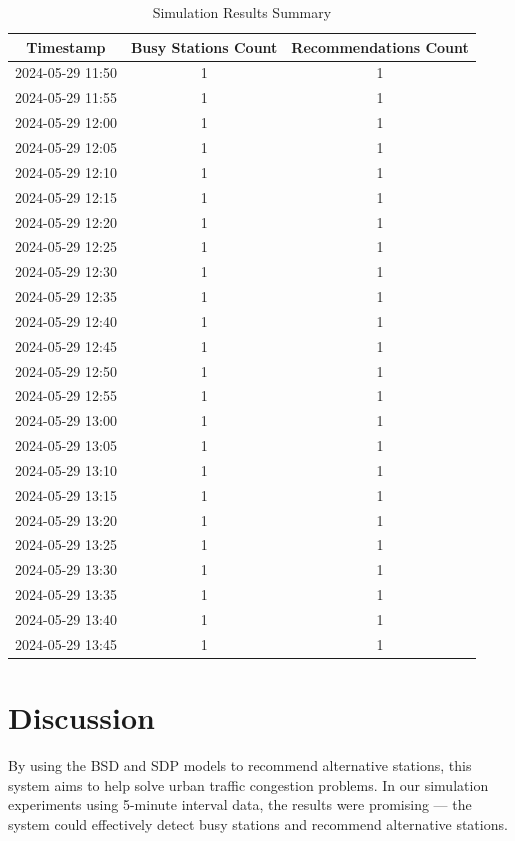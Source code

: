 \documentclass[11pt]{article} %
\begin{document}
\begin{table}[h]
	\centering
	\caption{Simulation Results Summary}
	\label{tab:simulation_results}
	\begin{tabular}{|c|c|c|}
		\hline
		\textbf{Timestamp} & \textbf{Busy Stations Count} & \textbf{Recommendations Count} \\ \hline
		2024-05-29 11:50 & 1 & 1 \\ \hline
		2024-05-29 11:55 & 1 & 1 \\ \hline
		2024-05-29 12:00 & 1 & 1 \\ \hline
		2024-05-29 12:05 & 1 & 1 \\ \hline
		2024-05-29 12:10 & 1 & 1 \\ \hline
		2024-05-29 12:15 & 1 & 1 \\ \hline
		2024-05-29 12:20 & 1 & 1 \\ \hline
		2024-05-29 12:25 & 1 & 1 \\ \hline
		2024-05-29 12:30 & 1 & 1 \\ \hline
		2024-05-29 12:35 & 1 & 1 \\ \hline
		2024-05-29 12:40 & 1 & 1 \\ \hline
		2024-05-29 12:45 & 1 & 1 \\ \hline
		2024-05-29 12:50 & 1 & 1 \\ \hline
		2024-05-29 12:55 & 1 & 1 \\ \hline
		2024-05-29 13:00 & 1 & 1 \\ \hline
		2024-05-29 13:05 & 1 & 1 \\ \hline
		2024-05-29 13:10 & 1 & 1 \\ \hline
		2024-05-29 13:15 & 1 & 1 \\ \hline
		2024-05-29 13:20 & 1 & 1 \\ \hline
		2024-05-29 13:25 & 1 & 1 \\ \hline
		2024-05-29 13:30 & 1 & 1 \\ \hline
		2024-05-29 13:35 & 1 & 1 \\ \hline
		2024-05-29 13:40 & 1 & 1 \\ \hline
		2024-05-29 13:45 & 1 & 1 \\ \hline
	\end{tabular}
\end{table}
\section{Discussion}
By using the BSD and SDP models to recommend alternative stations, this system aims to help solve urban traffic congestion problems. In our simulation experiments using 5-minute interval data, the results were promising — the system could effectively detect busy stations and recommend alternative stations.
\end{document}
